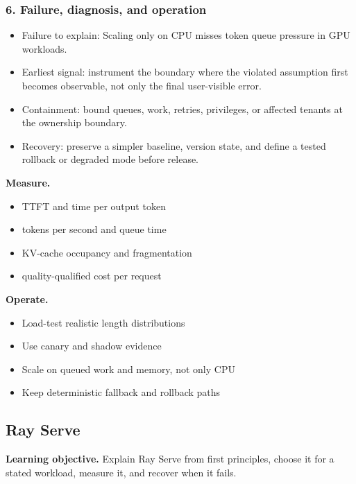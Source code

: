 \subsubsection*{6. Failure, diagnosis, and operation}
\begin{itemize}
\item Failure to explain: Scaling only on CPU misses token queue pressure in GPU workloads.
\item Earliest signal: instrument the boundary where the violated assumption first becomes observable, not only the final user-visible error.
\item Containment: bound queues, work, retries, privileges, or affected tenants at the ownership boundary.
\item Recovery: preserve a simpler baseline, version state, and define a tested rollback or degraded mode before release.
\end{itemize}
\textbf{Measure.}\begin{itemize}
\item TTFT and time per output token
\item tokens per second and queue time
\item KV-cache occupancy and fragmentation
\item quality-qualified cost per request
\end{itemize}
\textbf{Operate.}\begin{itemize}
\item Load-test realistic length distributions
\item Use canary and shadow evidence
\item Scale on queued work and memory, not only CPU
\item Keep deterministic fallback and rollback paths
\end{itemize}
\subsection{Ray Serve}
\textbf{Learning objective.} Explain Ray Serve from first principles, choose it for a stated workload, measure it, and recover when it fails.
